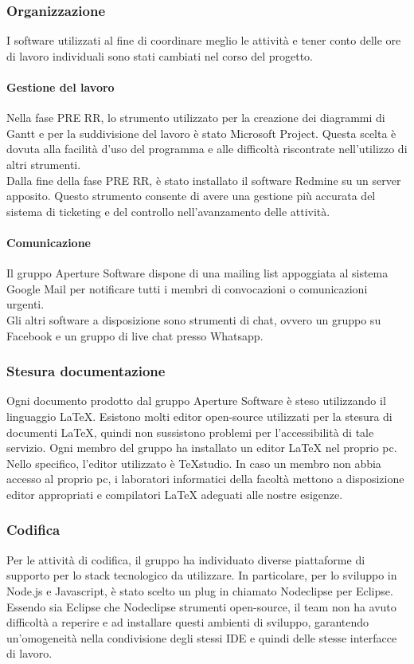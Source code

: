 \subsubsection{Organizzazione}
I software utilizzati al fine di coordinare meglio le attività e tener conto delle ore di lavoro individuali sono stati cambiati nel corso del progetto.\\
\paragraph{Gestione del lavoro}
Nella fase PRE RR, lo strumento utilizzato per la creazione dei diagrammi di Gantt e per la suddivisione del lavoro è stato Microsoft Project. Questa scelta è dovuta alla facilità d'uso del programma e alle difficoltà riscontrate nell'utilizzo di altri strumenti.\\
Dalla fine della fase PRE RR, è stato installato il software Redmine su un server apposito. Questo strumento consente di avere una gestione più accurata del sistema di ticketing e del controllo nell'avanzamento delle attività.
\paragraph{Comunicazione}
Il gruppo Aperture Software dispone di una mailing list appoggiata al sistema Google Mail per notificare tutti i membri di convocazioni o comunicazioni urgenti.\\
Gli altri software a disposizione sono strumenti di chat, ovvero un gruppo su Facebook e un gruppo di live chat presso Whatsapp. 

\subsubsection{Stesura documentazione}
Ogni documento prodotto dal gruppo Aperture Software è steso utilizzando il linguaggio \LaTeX{}. Esistono molti editor open-source utilizzati per la stesura di documenti \LaTeX{}, quindi non sussistono problemi per l'accessibilità di tale servizio. Ogni membro del gruppo ha installato un editor \LaTeX{} nel proprio pc. Nello specifico, l'editor utilizzato è TeXstudio. In caso un membro non abbia accesso al proprio pc, i laboratori informatici della facoltà mettono a disposizione editor appropriati e compilatori \LaTeX{} adeguati alle nostre esigenze.

\subsubsection{Codifica}
Per le attività di codifica, il gruppo ha individuato diverse piattaforme di supporto per lo stack tecnologico da utilizzare. In particolare, per lo sviluppo in Node.js e Javascript, è stato scelto un plug in chiamato Nodeclipse per Eclipse.\\
Essendo sia Eclipse che Nodeclipse strumenti open-source, il team non ha avuto difficoltà a reperire e ad installare questi ambienti di sviluppo, garantendo un'omogeneità nella condivisione degli stessi IDE e quindi delle stesse interfacce di lavoro.


